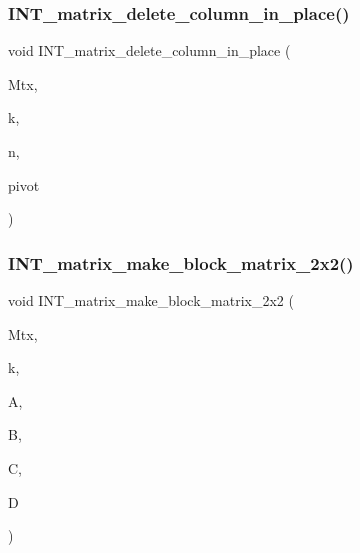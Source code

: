 \mbox{\label{util_8_c_a81b3d2daf39452ff0f93a3f18f67df51}} 
\subsubsection{\texorpdfstring{I\+N\+T\+\_\+matrix\+\_\+delete\+\_\+column\+\_\+in\+\_\+place()}{INT\_matrix\_delete\_column\_in\_place()}}
{\footnotesize\ttfamily void I\+N\+T\+\_\+matrix\+\_\+delete\+\_\+column\+\_\+in\+\_\+place (\begin{DoxyParamCaption}\item[{\mbox{\hyperlink{galois_8h_a09fddde158a3a20bd2dcadb609de11dc}{I\+NT}} $\ast$}]{Mtx,  }\item[{\mbox{\hyperlink{galois_8h_a09fddde158a3a20bd2dcadb609de11dc}{I\+NT}}}]{k,  }\item[{\mbox{\hyperlink{galois_8h_a09fddde158a3a20bd2dcadb609de11dc}{I\+NT}}}]{n,  }\item[{\mbox{\hyperlink{galois_8h_a09fddde158a3a20bd2dcadb609de11dc}{I\+NT}}}]{pivot }\end{DoxyParamCaption})}

\mbox{\label{util_8_c_aa0a9b4052db80026c3851cfd89f675aa}} 
\subsubsection{\texorpdfstring{I\+N\+T\+\_\+matrix\+\_\+make\+\_\+block\+\_\+matrix\+\_\+2x2()}{INT\_matrix\_make\_block\_matrix\_2x2()}}
{\footnotesize\ttfamily void I\+N\+T\+\_\+matrix\+\_\+make\+\_\+block\+\_\+matrix\+\_\+2x2 (\begin{DoxyParamCaption}\item[{\mbox{\hyperlink{galois_8h_a09fddde158a3a20bd2dcadb609de11dc}{I\+NT}} $\ast$}]{Mtx,  }\item[{\mbox{\hyperlink{galois_8h_a09fddde158a3a20bd2dcadb609de11dc}{I\+NT}}}]{k,  }\item[{\mbox{\hyperlink{galois_8h_a09fddde158a3a20bd2dcadb609de11dc}{I\+NT}} $\ast$}]{A,  }\item[{\mbox{\hyperlink{galois_8h_a09fddde158a3a20bd2dcadb609de11dc}{I\+NT}} $\ast$}]{B,  }\item[{\mbox{\hyperlink{galois_8h_a09fddde158a3a20bd2dcadb609de11dc}{I\+NT}} $\ast$}]{C,  }\item[{\mbox{\hyperlink{galois_8h_a09fddde158a3a20bd2dcadb609de11dc}{I\+NT}} $\ast$}]{D }\end{DoxyParamCaption})}

